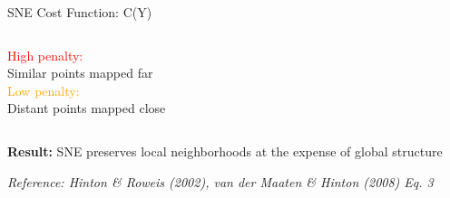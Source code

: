 \documentclass{beamer}
\begin{document}
\begin{frame}{SNE Cost Function: C(Y)}
\begin{columns}[T]
\begin{column}{0.48\textwidth}
\footnotesize
\textcolor{red}{High penalty:}\\
Similar points mapped far\\
\textcolor{orange}{Low penalty:}\\
Distant points mapped close
\end{column}
\end{columns}

\vspace{0.3cm}
\begin{center}
\colorbox{highlight!20}{
\begin{minipage}{0.85\textwidth}
\centering
\footnotesize\textbf{Result:} SNE preserves local neighborhoods at the expense of global structure
\end{minipage}
}
\end{center}

\vspace{0.2cm}
\begin{center}
\footnotesize
\textit{Reference: Hinton \& Roweis (2002), van der Maaten \& Hinton (2008) Eq. 3}
\end{center}
\end{frame}
\end{document}
